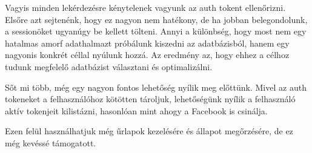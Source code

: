 Vagyis minden lekérdezésre kénytelenek vagyunk az auth tokent ellenőrizni. Elsőre azt sejtenénk, hogy ez nagyon nem hatékony, de ha jobban belegondolunk, a sessionöket ugyanúgy be kellett tölteni. Annyi a különbség, hogy most nem egy hatalmas amorf adathalmazt próbálunk kiszedni az adatbázisból, hanem egy nagyonis konkrét céllal nyúlunk hozzá. Az eredmény az, hogy ehhez a célhoz tudunk megfelelő adatbázist választani és optimalizálni.

Sőt mi több, még egy nagyon fontos lehetőség nyílik meg előttünk. Mivel az auth tokeneket a felhasználóhoz kötötten tároljuk, lehetőségünk nyílik a felhasználó aktív tokenjeit kilistázni, hasonlóan mint ahogy a Facebook is csinálja.

Ezen felül használhatjuk még űrlapok kezelésére és állapot megőrzésére, de ez még kevéssé támogatott. \cite{session}





























